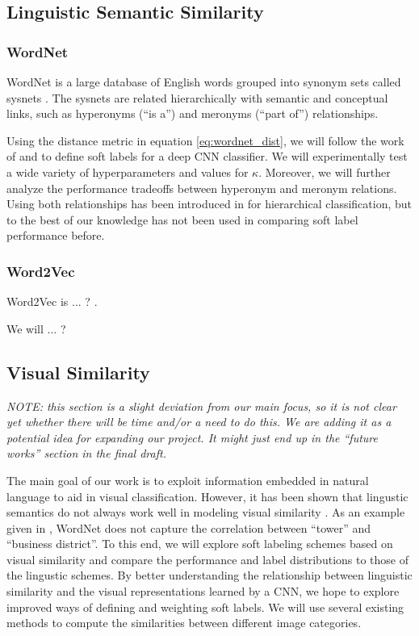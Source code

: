 \subsection{Linguistic Semantic Similarity}


\subsubsection{WordNet}

WordNet is a large database of English words grouped into synonym sets called
sysnets \cite{miller1995wordnet}.
The sysnets are related hierarchically with semantic and conceptual links, such
as hyperonyms (``is a'') and meronyms (``part of'') relationships.

Using the distance metric in equation \ref{eq:wordnet_dist}, we will follow the
work of \cite{fergus2010semantic} and \cite{zhao2011large} to define soft
labels for a deep CNN classifier. We will experimentally test a wide variety of
hyperparameters and values for $\kappa$.
Moreover, we will further analyze the performance tradeoffs between hyperonym
and meronym relations. Using both relationships has been introduced in
\cite{marszalek2007semantic} for hierarchical classification, but to the best
of our knowledge has not been used in comparing soft label performance before.


\subsubsection{Word2Vec}

Word2Vec is ... ? \cite{mikolov2013distributed}.

We will ... ?



\subsection{Visual Similarity}

\emph{
  NOTE: this section is a slight deviation from our main focus, so it is not
  clear yet whether there will be time and/or a need to do this. We are adding
  it as a potential idea for expanding our project. It might just end up in the
  ``future works'' section in the final draft.
}

The main goal of our work is to exploit information embedded in natural
language to aid in visual classification.
However, it has been shown that lingustic semantics do not always work well in
modeling visual similarity \cite{li2010building}. As an example given in
\cite{li2010building}, WordNet does not capture the correlation between
``tower'' and ``business district''.
To this end, we will explore soft labeling schemes based on visual similarity
and compare the performance and label distributions to those of the lingustic
schemes.
By better understanding the relationship between linguistic similarity and the
visual representations learned by a CNN, we hope to explore improved ways of
defining and weighting soft labels.
We will use several existing methods to compute the similarities between
different image categories.


